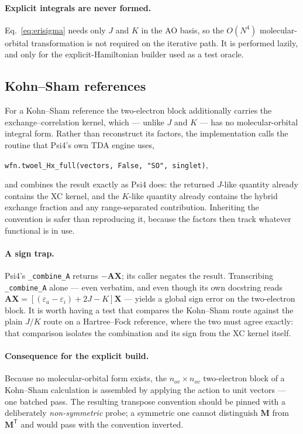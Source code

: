 \documentclass[11pt]{article}
\newcommand{\nov}{n_{ov}}
\begin{document}
\paragraph{Explicit integrals are never formed.} Eq.~\eqref{eq:erisigma} needs
only $J$ and $K$ in the AO basis, so the $O(N^4)$ molecular-orbital
transformation is not required on the iterative path. It is performed lazily,
and only for the explicit-Hamiltonian builder used as a test oracle.

\subsection{Kohn--Sham references}
\label{sec:ks}

For a Kohn--Sham reference the two-electron block additionally carries the
exchange--correlation kernel, which --- unlike $J$ and $K$ --- has no
molecular-orbital integral form. Rather than reconstruct its factors, the
implementation calls the routine that Psi4's own TDA engine uses,
\begin{center}
\texttt{wfn.twoel\_Hx\_full(vectors, False, "SO", singlet)},
\end{center}
and combines the result exactly as Psi4 does: the returned $J$-like quantity
already contains the XC kernel, and the $K$-like quantity already contains the
hybrid exchange fraction and any range-separated contribution. Inheriting the
convention is safer than reproducing it, because the factors then track whatever
functional is in use.

\paragraph{A sign trap.} Psi4's \texttt{\_combine\_A} returns $-\bm{A}\bm{X}$;
its caller negates the result. Transcribing \texttt{\_combine\_A} alone --- even
verbatim, and even though its own docstring reads
$\bm{A}\bm{X} = [(\varepsilon_a - \varepsilon_i) + 2J - K]\bm{X}$ --- yields a
global sign error on the two-electron block. It is worth having a test that
compares the Kohn--Sham route against the plain $J/K$ route on a Hartree--Fock
reference, where the two must agree exactly: that comparison isolates the
combination and its sign from the XC kernel itself.

\paragraph{Consequence for the explicit build.} Because no molecular-orbital
form exists, the $\nov \times \nov$ two-electron block of a Kohn--Sham
calculation is assembled by applying the action to unit vectors --- one batched
pass. The resulting transpose convention should be pinned with a deliberately
\emph{non-symmetric} probe; a symmetric one cannot distinguish $\bm{M}$ from
$\bm{M}^{\mathsf{T}}$ and would pass with the convention inverted.
\end{document}
